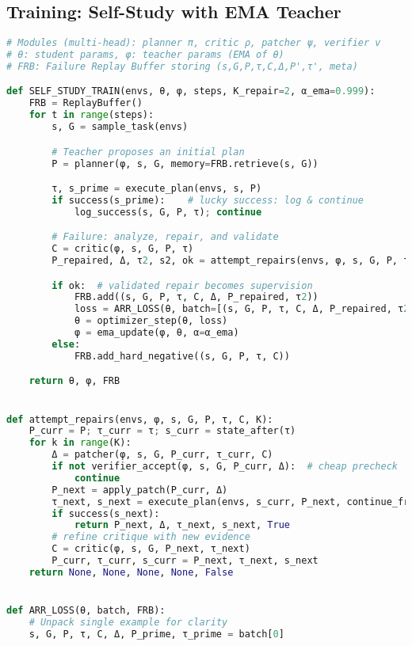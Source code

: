 \documentclass[11pt]{article}
\begin{document}
\subsection{Training: Self-Study with EMA Teacher}
\begin{lstlisting}[language=Python, caption={Training with Self-Study (EMA teacher variant).}, label={lst:train}]
# Modules (multi-head): planner π, critic ρ, patcher ψ, verifier v
# θ: student params, φ: teacher params (EMA of θ)
# FRB: Failure Replay Buffer storing (s,G,P,τ,C,Δ,P',τ', meta)

def SELF_STUDY_TRAIN(envs, θ, φ, steps, K_repair=2, α_ema=0.999):
    FRB = ReplayBuffer()
    for t in range(steps):
        s, G = sample_task(envs)

        # Teacher proposes an initial plan
        P = planner(φ, s, G, memory=FRB.retrieve(s, G))

        τ, s_prime = execute_plan(envs, s, P)
        if success(s_prime):    # lucky success: log & continue
            log_success(s, G, P, τ); continue

        # Failure: analyze, repair, and validate
        C = critic(φ, s, G, P, τ)
        P_repaired, Δ, τ2, s2, ok = attempt_repairs(envs, φ, s, G, P, τ, C, K_repair)

        if ok:  # validated repair becomes supervision
            FRB.add((s, G, P, τ, C, Δ, P_repaired, τ2))
            loss = ARR_LOSS(θ, batch=[(s, G, P, τ, C, Δ, P_repaired, τ2)], FRB=FRB)
            θ = optimizer_step(θ, loss)
            φ = ema_update(φ, θ, α=α_ema)
        else:
            FRB.add_hard_negative((s, G, P, τ, C))

    return θ, φ, FRB


def attempt_repairs(envs, φ, s, G, P, τ, C, K):
    P_curr = P; τ_curr = τ; s_curr = state_after(τ)
    for k in range(K):
        Δ = patcher(φ, s, G, P_curr, τ_curr, C)
        if not verifier_accept(φ, s, G, P_curr, Δ):  # cheap precheck
            continue
        P_next = apply_patch(P_curr, Δ)
        τ_next, s_next = execute_plan(envs, s_curr, P_next, continue_from=True)
        if success(s_next):
            return P_next, Δ, τ_next, s_next, True
        # refine critique with new evidence
        C = critic(φ, s, G, P_next, τ_next)
        P_curr, τ_curr, s_curr = P_next, τ_next, s_next
    return None, None, None, None, False


def ARR_LOSS(θ, batch, FRB):
    # Unpack single example for clarity
    s, G, P, τ, C, Δ, P_prime, τ_prime = batch[0]


\end{lstlisting}
\end{document}
